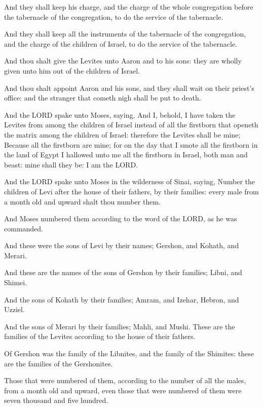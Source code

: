 \Verse And they shall keep his charge, and the charge of the whole
congregation before the tabernacle of the congregation, to do the
service of the tabernacle.

\Verse And they shall keep all the instruments of the tabernacle of the
congregation, and the charge of the children of Israel, to do the
service of the tabernacle.

\Verse And thou shalt give the Levites unto Aaron and to his sons: they
are wholly given unto him out of the children of Israel.

\Verse And thou shalt appoint Aaron and his sons, and they shall wait on
their priest's office: and the stranger that cometh nigh shall be put
to death.

\Verse And the LORD spake unto Moses, saying, \Verse And I, behold, I have
taken the Levites from among the children of Israel instead of all the
firstborn that openeth the matrix among the children of Israel:
therefore the Levites shall be mine; \Verse Because all the firstborn
are mine; for on the day that I smote all the firstborn in the land of
Egypt I hallowed unto me all the firstborn in Israel, both man and
beast: mine shall they be: I am the LORD.

\Verse And the LORD spake unto Moses in the wilderness of Sinai, saying,
\Verse Number the children of Levi after the house of their fathers, by
their families: every male from a month old and upward shalt thou
number them.

\Verse And Moses numbered them according to the word of the LORD, as he
was commanded.

\Verse And these were the sons of Levi by their names; Gershon, and
Kohath, and Merari.

\Verse And these are the names of the sons of Gershon by their families;
Libni, and Shimei.

\Verse And the sons of Kohath by their families; Amram, and Izehar,
Hebron, and Uzziel.

\Verse And the sons of Merari by their families; Mahli, and Mushi. These
are the families of the Levites according to the house of their
fathers.

\Verse Of Gershon was the family of the Libnites, and the family of the
Shimites: these are the families of the Gershonites.

\Verse Those that were numbered of them, according to the number of all
the males, from a month old and upward, even those that were numbered
of them were seven thousand and five hundred.

